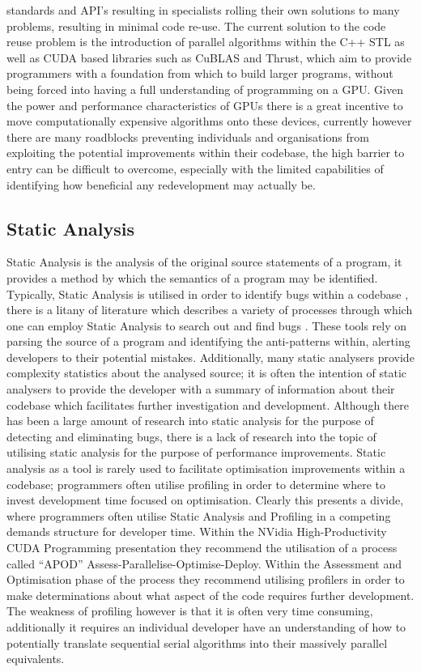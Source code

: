 standards and API’s resulting in specialists rolling their own solutions to many problems, resulting
in minimal code re-use. The current solution to the code reuse problem is the introduction of
parallel algorithms within the C++ STL as well as CUDA based libraries such as CuBLAS and Thrust,
which aim to provide programmers with a foundation from which to build larger programs, without
being forced into having a full understanding of programming on a GPU. Given the power and
performance characteristics of GPUs there is a great incentive to move computationally expensive
algorithms onto these devices, currently however there are many roadblocks preventing individuals
and organisations from exploiting the potential improvements within their codebase, the high barrier
to entry can be difficult to overcome, especially with the limited capabilities of identifying how
beneficial any redevelopment may actually be.

\subsection{Static Analysis}
Static Analysis is the analysis of the original source statements of a program, it provides a method
by which the semantics of a program may be identified.  Typically, Static Analysis is utilised in
order to identify bugs within a codebase \cite{bessey2010few}, there is a litany of literature which
describes a variety of processes through which one can employ Static Analysis to search out and find
bugs \cite{ball2001automatically} \cite{bush2000static}. These tools rely on parsing the source of a
program and identifying the anti-patterns within, alerting developers to their potential mistakes.
Additionally, many static analysers provide complexity statistics about the analysed source; it is
often the intention of static analysers to provide the developer with a summary of information about
their codebase which facilitates further investigation and development.  Although there has been a
large amount of research into static analysis for the purpose of detecting and eliminating bugs,
there is a lack of research into the topic of utilising static analysis for the purpose of
performance improvements.  Static analysis as a tool is rarely used to facilitate optimisation
improvements within a codebase; programmers often utilise profiling in order to determine where to
invest development time focused on optimisation.  Clearly this presents a divide, where programmers
often utilise Static Analysis and Profiling in a competing demands structure for developer time.
Within the NVidia High-Productivity CUDA Programming presentation \cite{nvidiapresentation}
they recommend the utilisation of a process called “APOD” Assess-Parallelise-Optimise-Deploy.
Within the Assessment and Optimisation phase of the process they recommend utilising profilers in
order to make determinations about what aspect of the code requires further development. The
weakness of profiling however is that it is often very time consuming, additionally it requires an
individual developer have an understanding of how to potentially translate sequential serial
algorithms into their massively parallel equivalents. 

